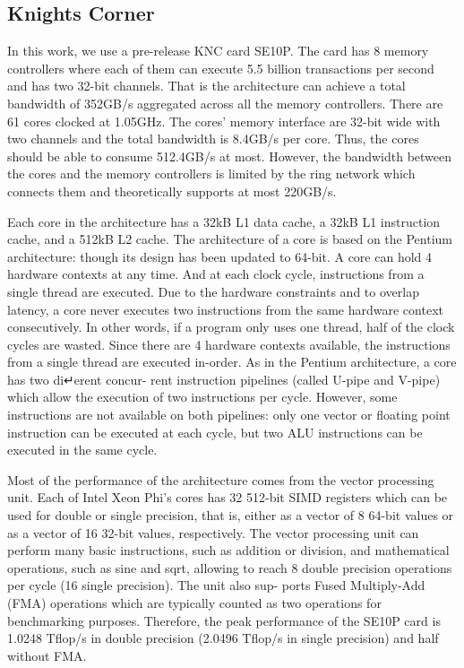 \documentclass[10pt, conference, compsocconf]{IEEEtran}
\begin{document}
\subsection{Knights Corner}

In this work, we use a pre-release KNC card SE10P. The card has 8
memory controllers where each of them can execute 5.5 billion
transactions per second and has two 32-bit channels. That is the
architecture can achieve a total bandwidth of 352GB/s aggregated
across all the memory controllers. There are 61 cores clocked at
1.05GHz. The cores’ memory interface are 32-bit wide with two channels
and the total bandwidth is 8.4GB/s per core. Thus, the cores should be
able to consume 512.4GB/s at most. However, the bandwidth between
the cores and the memory controllers is limited by the ring network
which connects them and theoretically supports at most 220GB/s.

Each core in the architecture has a 32kB L1 data cache, a 32kB L1
instruction cache, and a 512kB L2 cache. The architecture of a core is
based on the Pentium architecture: though its design has been updated
to 64-bit. A core can hold 4 hardware contexts at any time. And at
each clock cycle, instructions from a single thread are executed. Due
to the hardware constraints and to overlap latency, a core never
executes two instructions from the same hardware context
consecutively. In other words, if a program only uses one thread, half
of the clock cycles are wasted. Since there are 4 hardware contexts
available, the instructions from a single thread are executed
in-order. As in the Pentium architecture, a core has two di↵erent
concur- rent instruction pipelines (called U-pipe and V-pipe) which
allow the execution of two instructions per cycle. However, some
instructions are not available on both pipelines: only one vector or
floating point instruction can be executed at each cycle, but two ALU
instructions can be executed in the same cycle.

Most of the performance of the architecture comes from the vector
processing unit. Each of Intel Xeon Phi’s cores has 32 512-bit SIMD
registers which can be used for double or single precision, that is,
either as a vector of 8 64-bit values or as a vector of 16 32-bit
values, respectively. The vector processing unit can perform many
basic instructions, such as addition or division, and mathematical
operations, such as sine and sqrt, allowing to reach 8 double
precision operations per cycle (16 single precision). The unit also
sup- ports Fused Multiply-Add (FMA) operations which are typically
counted as two operations for benchmarking purposes. Therefore, the
peak performance of the SE10P card is 1.0248 Tflop/s in double
precision (2.0496 Tflop/s in single precision) and half without FMA.
\end{document}
